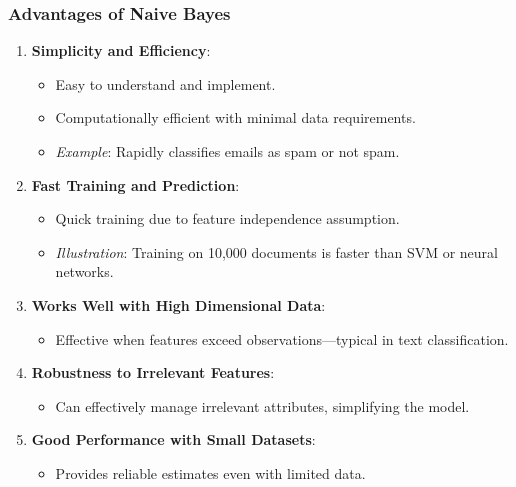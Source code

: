 \documentclass[aspectratio=169]{beamer}
\begin{document}
\begin{frame}[fragile]
    \frametitle{Advantages of Naive Bayes}
    \begin{enumerate}
        \item \textbf{Simplicity and Efficiency}:
        \begin{itemize}
            \item Easy to understand and implement.
            \item Computationally efficient with minimal data requirements.
            \item \textit{Example}: Rapidly classifies emails as spam or not spam.
        \end{itemize}
        
        \item \textbf{Fast Training and Prediction}:
        \begin{itemize}
            \item Quick training due to feature independence assumption.
            \item \textit{Illustration}: Training on 10,000 documents is faster than SVM or neural networks.
        \end{itemize}
        
        \item \textbf{Works Well with High Dimensional Data}:
        \begin{itemize}
            \item Effective when features exceed observations—typical in text classification.
        \end{itemize}

        \item \textbf{Robustness to Irrelevant Features}:
        \begin{itemize}
            \item Can effectively manage irrelevant attributes, simplifying the model.
        \end{itemize}
        
        \item \textbf{Good Performance with Small Datasets}:
        \begin{itemize}
            \item Provides reliable estimates even with limited data.
        \end{itemize}
    \end{enumerate}
\end{frame}
\end{document}
